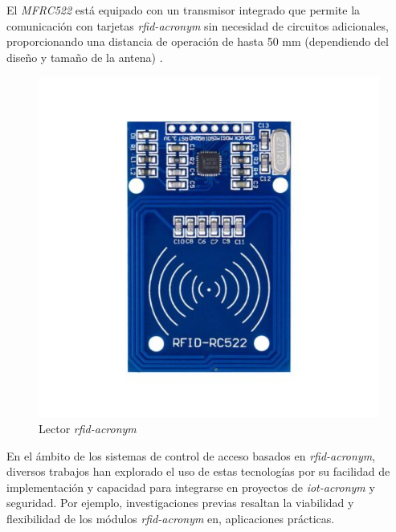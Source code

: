 El \textit{MFRC522} está equipado con un transmisor integrado que permite la comunicación con tarjetas \textit{\acrshort{rfid-acronym}} sin necesidad de circuitos adicionales, proporcionando una distancia de operación de hasta 50 mm (dependiendo del diseño y tamaño de la antena) \cite{MFRC522Datasheet}. 

\begin{figure}[H]
\leavevmode
\begin{minipage}{\textwidth}
\begin{center}
\includegraphics[scale=0.35]{./capitulo_03/figures/HW/rc522.jpg}
\caption{Lector \textit{\acrshort{rfid-acronym}} \label{fig:rc522rf}}
\end{center}
\end{minipage}
\end{figure}

En el ámbito de los sistemas de control de acceso basados en \textit{\acrshort{rfid-acronym}}, diversos trabajos han explorado el uso de estas tecnologías por su facilidad de implementación y capacidad para integrarse en proyectos de \textit{\acrshort{iot-acronym}} y seguridad. Por ejemplo, investigaciones previas \cite{Cherkaoui2021Review, Latifov2023Design} resaltan la viabilidad y flexibilidad de los módulos \textit{\acrshort{rfid-acronym}} en, aplicaciones prácticas.

